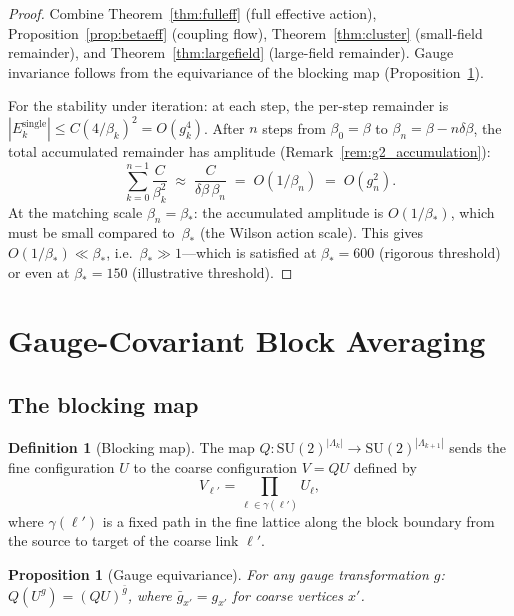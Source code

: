 \documentclass[11pt]{article}
\newtheorem{proposition}[theorem]{Proposition}
\theoremstyle{definition}
\newtheorem{definition}[theorem]{Definition}
\newcommand{\SU}{\mathrm{SU}}
\begin{document}
\begin{proof}
Combine Theorem~\ref{thm:fulleff} (full effective action),
Proposition~\ref{prop:betaeff} (coupling flow),
Theorem~\ref{thm:cluster} (small-field remainder), and
Theorem~\ref{thm:largefield} (large-field remainder).
Gauge invariance follows from the equivariance of the blocking map
(Proposition~\ref{prop:equiv}).

For the stability under iteration: at each step, the per-step
remainder is $|E_k^{\mathrm{single}}|\le C(4/\beta_k)^2=O(g_k^4)$.
After $n$ steps from $\beta_0=\beta$ to $\beta_n=\beta-n\delta\beta$,
the total accumulated remainder has amplitude
(Remark~\ref{rem:g2_accumulation}):
\begin{equation}
\sum_{k=0}^{n-1}\frac{C}{\beta_k^2}
\;\approx\;\frac{C}{\delta\beta\,\beta_n}
\;=\;O(1/\beta_n)\;=\;O(g_n^2).
\end{equation}
At the matching scale $\beta_n=\beta_*$: the accumulated amplitude
is $O(1/\beta_*)$, which must be small compared to~$\beta_*$
(the Wilson action scale).  This gives
$O(1/\beta_*)\ll\beta_*$, i.e.\ $\beta_*\gg 1$---which is
satisfied at $\beta_*=600$ (rigorous threshold) or even
at $\beta_*=150$ (illustrative threshold).
\end{proof}

\section{Gauge-Covariant Block Averaging}\label{sec:blocking}

\subsection{The blocking map}

\begin{definition}[Blocking map]\label{def:blockingmap}
The map $Q:\SU(2)^{|\Lambda_k|}\to\SU(2)^{|\Lambda_{k+1}|}$ sends the
fine configuration $U$ to the coarse configuration $V=QU$ defined by
\begin{equation}
V_{\ell'}=\prod_{\ell\in\gamma(\ell')}U_\ell,
\end{equation}
where $\gamma(\ell')$ is a fixed path in the fine lattice along the
block boundary from the source to target of the coarse link $\ell'$.
\end{definition}

\begin{proposition}[Gauge equivariance]\label{prop:equiv}
For any gauge transformation $g$:
$Q(U^g)=(QU)^{\bar{g}}$, where $\bar{g}_{x'}=g_{x'}$ for coarse
vertices $x'$.
\end{proposition}
\end{document}
